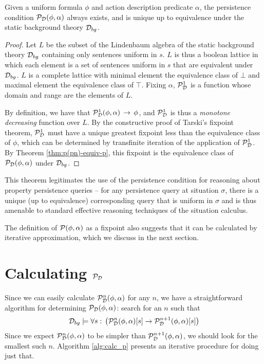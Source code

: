 \begin{thm}
Given a uniform formula $\phi$ and action description predicate $\alpha$,
the persistence condition $\mathcal{P}_{\mathcal{D}}(\phi,\alpha)$ always exists,
and is unique up to equivalence under the static background theory
$\mathcal{D}_{bg}$. \label{thm:p-always-exists} 
\end{thm}
\begin{proof}
Let $L$ be the subset of the Lindenbaum algebra of the static background
theory $\mathcal{D}_{bg}$ containing only sentences uniform in $s$. $L$
is thus a boolean lattice in which each element is a set of sentences
uniform in $s$ that are equivalent under $\mathcal{D}_{bg}$. $L$ is a complete
lattice with minimal element the equivalence class of $\bot$ and
maximal element the equivalence class of $\top$. Fixing $\alpha$,
$\mathcal{P}^{1}_{\mathcal{D}}$ is a function whose domain and range are the elements of
$L$.

By definition, we have that $\mathcal{P}^{1}_{\mathcal{D}}(\phi,\alpha)\,\rightarrow\,\phi$,
and $\mathcal{P}^{1}_{\mathcal{D}}$ is thus a \emph{monotone decreasing} function over $L$.
By the constructive proof of Tarski's fixpoint theorem, $\mathcal{P}^{1}_{\mathcal{D}}$
must have a unique greatest fixpoint less than the equivalence class
of $\phi$, which can be determined by transfinite iteration of the
application of $\mathcal{P}^{1}_{\mathcal{D}}$. By Theorem \ref{thm:p(pn)-equiv-p}, this
fixpoint is the equivalence class of $\mathcal{P}_{\mathcal{D}}(\phi,\alpha)$ under
$\mathcal{D}_{bg}$. 
\end{proof}
This theorem legitimates the use of the persistence condition for
reasoning about property persistence queries -- for any persistence
query at situation $\sigma$, there is a unique (up to equivalence)
corresponding query that is uniform in $\sigma$ and is thus amenable
to standard effective reasoning techniques of the situation calculus.

The definition of $\mathcal{P}(\phi,\alpha)$ as a fixpoint also suggests
that it can be calculated by iterative approximation, which we discuss
in the next section.


\section{Calculating $\mathcal{P}_{\mathcal{D}}$\label{sec:Persistence:Calculating}}

Since we can easily calculate $\mathcal{P}_{\mathcal{D}}^{n}(\phi,\alpha)$ for any
$n$, we have a straightforward algorithm for determining $\mathcal{P}_{\mathcal{D}}(\phi,\alpha)$:
search for an $n$ such that\[
\mathcal{D}_{bg}\models\forall s:\,\left(\mathcal{P}_{\mathcal{D}}^{n}(\phi,\alpha)[s]\rightarrow\mathcal{P}_{\mathcal{D}}^{n+1}(\phi,\alpha)[s]\right)\]
 Since we expect $\mathcal{P}_{\mathcal{D}}^{n}(\phi,\alpha)$ to be simpler than
$\mathcal{P}_{\mathcal{D}}^{n+1}(\phi,\alpha)$, we should look for the smallest
such $n$. Algorithm \ref{alg:calc_p} presents an iterative procedure
for doing just that.

